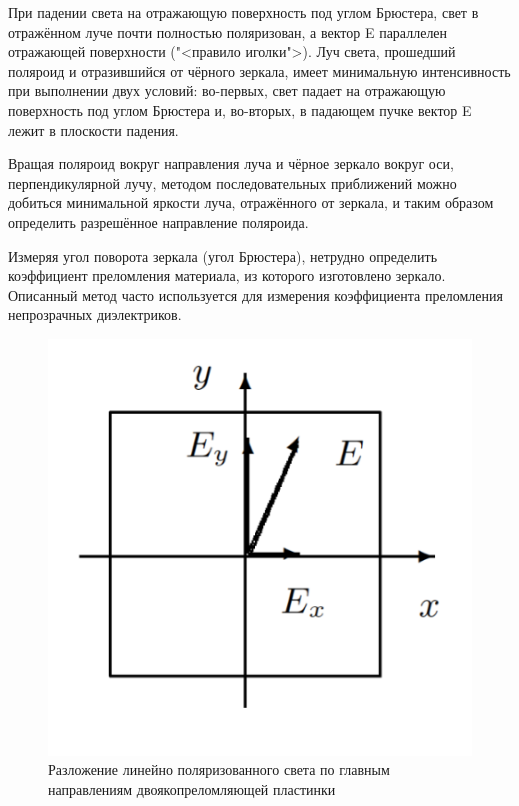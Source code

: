 \documentclass[a4paper, 12pt]{article}%
\begin{document}
	При падении света на отражающую поверхность под углом Брюстера, свет в отражённом луче почти полностью поляризован, а вектор E
	параллелен отражающей поверхности ("<правило иголки">). Луч света,
	прошедший поляроид и отразившийся от чёрного зеркала, имеет минимальную интенсивность при выполнении двух условий: во-первых, свет
	падает на отражающую поверхность под углом Брюстера и, во-вторых,
	в падающем пучке вектор E лежит в плоскости падения.
	
	Вращая поляроид вокруг направления луча и чёрное зеркало вокруг
	оси, перпендикулярной лучу, методом последовательных приближений
	можно добиться минимальной яркости луча, отражённого от зеркала,
	и таким образом определить разрешённое направление поляроида.
	
	Измеряя угол поворота зеркала (угол Брюстера), нетрудно определить коэффициент преломления материала, из которого изготовлено
	зеркало. Описанный метод часто используется для измерения коэффициента преломления непрозрачных диэлектриков.\\
	\begin{figure} 
		\includegraphics[width=\linewidth]{1}
		\caption{Разложение линейно поляризованного света по главным направлениям двоякопреломляющей пластинки}
		\label{ris 1}
	\end{figure}
	
\end{document}

